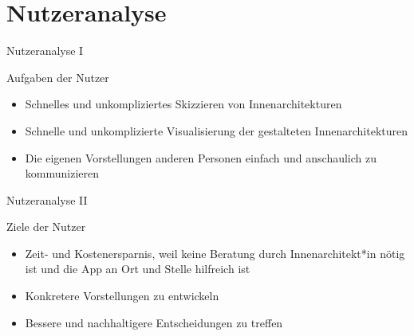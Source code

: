 \documentclass[presentation,bigger,aspectratio=169]{beamer}
\begin{document}
\section{Nutzeranalyse}
\label{sec:orgbe94d21}
\begin{frame}[label={sec:orgf6276c9}]{\vspace{2.2cm}\begin{center}\MakeUppercase{\insertsection}\end{center}}
\end{frame}

\begin{frame}[label={sec:org6031bcc}]{Nutzeranalyse I}
\begin{block}{Aufgaben der Nutzer}
\begin{itemize}
\item Schnelles und unkompliziertes Skizzieren von Innenarchitekturen
\item Schnelle und unkomplizierte Visualisierung der gestalteten Innenarchitekturen
\item Die eigenen Vorstellungen anderen Personen einfach und anschaulich
zu kommunizieren
\end{itemize}
\end{block}
\end{frame}

\begin{frame}[label={sec:orgfc14395}]{Nutzeranalyse II}
\begin{block}{Ziele der Nutzer}
\begin{itemize}
\item Zeit- und Kostenersparnis, weil keine Beratung durch
Innenarchitekt*in nötig ist und die App an Ort und Stelle hilfreich
ist
\item Konkretere Vorstellungen zu entwickeln
\item Bessere und nachhaltigere Entscheidungen zu treffen
\end{itemize}
\end{block}
\end{frame}
\end{document}
